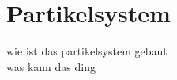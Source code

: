 \chapter{Partikelsystem}
\begin{Spacing}{\mylinespace}

wie ist das partikelsystem gebaut\\
was kann das ding\\

\end{Spacing}
\newpage
\clearpage
